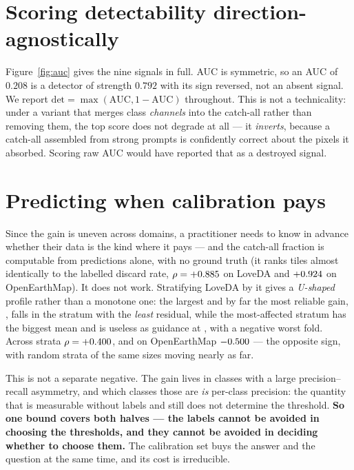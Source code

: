 \documentclass[10pt,a4paper]{article}                        %
\newcommand{\best}[1]{\textbf{#1}}
\begin{document}
\section{Scoring detectability direction-agnostically}
\label{sup:auc}

Figure~\ref{fig:auc} gives the nine signals in full.
 AUC is symmetric,
so an AUC of $0.208$ is a detector of strength $0.792$ with its sign reversed, not
an absent signal. We report $\mathrm{det} = \max(\mathrm{AUC}, 1-\mathrm{AUC})$
throughout. This is not a technicality: under a variant that merges class
\emph{channels} into the catch-all rather than removing them, the top score does
not degrade at all --- it \emph{inverts}, because a catch-all assembled from
strong prompts is confidently correct about the pixels it absorbed. Scoring raw
AUC would have reported that as a destroyed signal.

\section{Predicting when calibration pays}
\label{sup:when}

Since the gain is uneven across domains, a practitioner
needs to know in advance whether their data is the kind where it pays --- and the
catch-all fraction is computable from predictions alone, with no ground truth
(it ranks tiles almost identically to the labelled discard rate,
$\rho=+0.885{}$ on LoveDA and $+0.924{}$ on OpenEarthMap). It does
not work. Stratifying LoveDA by it gives a \emph{U-shaped} profile rather than a
monotone one: the largest and by far the most reliable gain, \crLow{}, falls in
the stratum with the \emph{least} residual, while the most-affected stratum has
the biggest mean and is useless as guidance at \crHigh{}, with a negative worst
fold. Across strata $\rho=+0.400{}$, and on OpenEarthMap $-0.500{}$ --- the
opposite sign, with random strata of the same sizes moving nearly as far.

This is not a separate negative. The gain lives in classes with a large
precision--recall asymmetry, and which classes those are \emph{is} per-class
precision: the quantity that is measurable without labels and still does not
determine the threshold. \best{So one bound covers both halves --- the labels
cannot be avoided in choosing the thresholds, and they cannot be avoided in
deciding whether to choose them.} The calibration set buys the answer and the
question at the same time, and its cost is irreducible.
\end{document}
